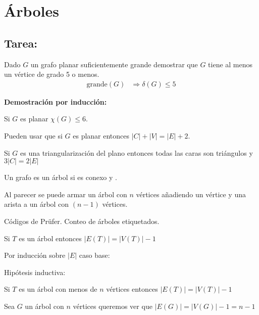 \documentclass[../main.tex]{subfiles}
\begin{document}
\chapter{Árboles}%

\thispagestyle{fancy}

\section*{Tarea:}%
Dado $G$ un grafo planar suficientemente grande demostrar que $G$ tiene al
menos un vértice de grado 5 o menos.
\begin{align*}
	\text{grande}(G) &\Rightarrow \delta(G) \leq 5
\end{align*}

\textbf{Demostración por inducción:}

Si $G$ es planar $\chi(G) \leq 6$.

Pueden usar que si $G$ es planar entonces $|C|+|V|=|E|+2$.

Si $G$ es una triangularización del plano entonces todas las caras son
triángulos y $3|C|=2|E|$

Un grafo es un árbol si es conexo y .

\ejemplo

\begin{figure}[H]
	\centering
	
\end{figure}

\begin{figure}[H]
	\boldmath
	\bfseries
	\centering
	
\end{figure}
Al parecer se puede armar un árbol con $n$ vértices añadiendo un vértice y
una arista a un árbol con $(n-1)$ vértices.

Códigos de Prüfer.
Conteo de árboles etiquetados.

\conjetura
Si $T$ es un árbol entonces $|E(T)|=|V(T)|-1$

Por inducción sobre $|E|$ caso base:

\begin{figure}[H]
	\centering
	
\end{figure}

Hipótesis inductiva:

Si $T$ es un árbol con menos de $n$ vértices entonces $|E(T)|= |V(T)|-1$

Sea $G$ un árbol con $n$ vértices queremos ver que $|E(G)|=|V(G)|-1=n-1$
\end{document}
